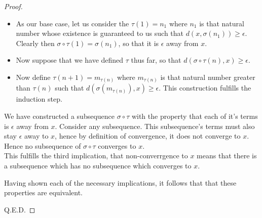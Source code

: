 \documentclass[11pt]{article}
\theoremstyle{definition}
\begin{document}
\begin{proof}
\begin{itemize}
\begin{itemize}
\item As our base case, let us consider the $\tau(1) = n_1$ where $n_1$ is that natural number whose existence is guaranteed to us such that $d(x, \sigma(n_1)) \ge \epsilon $. Clearly then $\sigma\circ \tau (1) = \sigma(n_1)$, so that it is $\epsilon$ away from $x$. 
\item Now suppose that we have defined $\tau$ thus far, so that $d(\sigma\circ \tau(n), x ) \ge \epsilon$. 
\item Now define $\tau(n+1) = m_{\tau(n)}$ where $m_{\tau(n)}$ is that natural number greater than $\tau(n)$ such that $d(\sigma(m_{\tau(n)}), x) \ge \epsilon $. This construction fulfills the induction step.


\end{itemize}
We have constructed a subsequence $\sigma\circ \tau$ with the property that each of it's terms is $\epsilon$ away from $x$. Consider any subsequence. This subsequence's terms must also stay $\epsilon$ away to $x$, hence by definition of convergence, it does not converge to $x$. Hence no subsequence of $\sigma\circ \tau$ converges to $x$. \\
This fulfills the third implication, 
that non-converrgence to $x$ means that there is a subsequence which has no subsequence which converges to $x$. \\

\end{itemize}
Having shown each of the necessary implications, it follows that that these properties are equivalent.

Q.E.D.
\end{proof}
\end{document}
